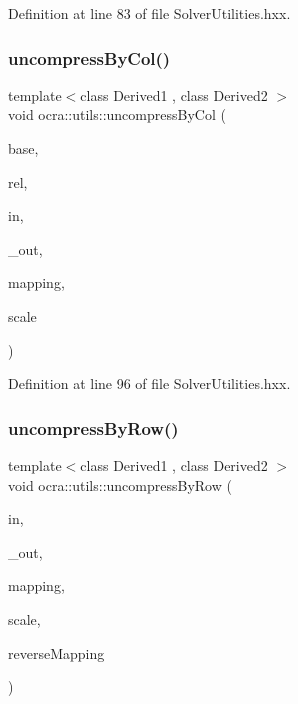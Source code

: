 Definition at line 83 of file Solver\+Utilities.\+hxx.

\hypertarget{namespaceocra_1_1utils_ae2055de35b65215e1f23b0988fe20705}{}\label{namespaceocra_1_1utils_ae2055de35b65215e1f23b0988fe20705} 
\subsubsection{\texorpdfstring{uncompress\+By\+Col()}{uncompressByCol()}\hspace{0.1cm}{\footnotesize\ttfamily [2/2]}}
{\footnotesize\ttfamily template$<$class Derived1 , class Derived2 $>$ \\
void ocra\+::utils\+::uncompress\+By\+Col (\begin{DoxyParamCaption}\item[{const \hyperlink{classocra_1_1Variable}{Variable} \&}]{base,  }\item[{const \hyperlink{classocra_1_1Variable}{Variable} \&}]{rel,  }\item[{const Matrix\+Base$<$ Derived1 $>$ \&}]{in,  }\item[{Matrix\+Base$<$ Derived2 $>$ const \&}]{\+\_\+out,  }\item[{std\+::vector$<$ int $>$ \&}]{mapping,  }\item[{double}]{scale }\end{DoxyParamCaption})\hspace{0.3cm}{\ttfamily [inline]}}



Definition at line 96 of file Solver\+Utilities.\+hxx.

\hypertarget{namespaceocra_1_1utils_a151ee2cecba7ea9527fbdc8be061cd98}{}\label{namespaceocra_1_1utils_a151ee2cecba7ea9527fbdc8be061cd98} 
\subsubsection{\texorpdfstring{uncompress\+By\+Row()}{uncompressByRow()}\hspace{0.1cm}{\footnotesize\ttfamily [1/2]}}
{\footnotesize\ttfamily template$<$class Derived1 , class Derived2 $>$ \\
void ocra\+::utils\+::uncompress\+By\+Row (\begin{DoxyParamCaption}\item[{const Matrix\+Base$<$ Derived1 $>$ \&}]{in,  }\item[{Matrix\+Base$<$ Derived2 $>$ const \&}]{\+\_\+out,  }\item[{const std\+::vector$<$ int $>$ \&}]{mapping,  }\item[{double}]{scale,  }\item[{bool}]{reverse\+Mapping }\end{DoxyParamCaption})\hspace{0.3cm}{\ttfamily [inline]}}



